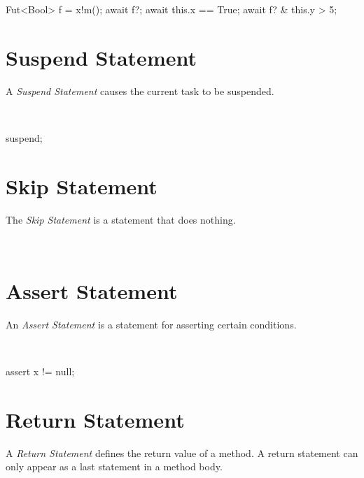 \begin{absexample}
Fut<Bool> f = x!m();
await f?;
await this.x == True;
await f? & this.y > 5;
\end{absexample}

\section{Suspend Statement}
A \emph{Suspend Statement} causes the current task to be suspended.

\begin{abssyntax}
  {}\ \TRS{;}
\end{abssyntax}

\begin{absexample}
suspend;
\end{absexample}

\section{Skip Statement}
The \emph{Skip Statement} is a statement that does nothing.

\begin{abssyntax}
  {}\ \TRS{;}
\end{abssyntax}

\section{Assert Statement}\label{sec:abs:assert}
An \emph{Assert Statement} is a statement for asserting certain conditions.

\begin{abssyntax}
  {}\ \ \TRS{;}
\end{abssyntax}

\begin{absexample}
assert x != null;
\end{absexample}

\section{Return Statement}
A \emph{Return Statement} defines the return value of a method.
A return statement can only appear as a last statement in a method body.

\begin{abssyntax}
  {}\ \ \TRS{;}
\end{abssyntax}


